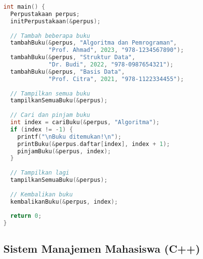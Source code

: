 \documentclass[../main.tex]{subfiles}
\begin{document}
\begin{lstlisting}[language=C, caption={Sistem perpustakaan sederhana di C}]
int main() {
  Perpustakaan perpus;
  initPerpustakaan(&perpus);
  
  // Tambah beberapa buku
  tambahBuku(&perpus, "Algoritma dan Pemrograman", 
             "Prof. Ahmad", 2023, "978-1234567890");
  tambahBuku(&perpus, "Struktur Data", 
             "Dr. Budi", 2022, "978-0987654321");
  tambahBuku(&perpus, "Basis Data", 
             "Prof. Citra", 2021, "978-1122334455");
  
  // Tampilkan semua buku
  tampilkanSemuaBuku(&perpus);
  
  // Cari dan pinjam buku
  int index = cariBuku(&perpus, "Algoritma");
  if (index != -1) {
    printf("\nBuku ditemukan!\n");
    printBuku(&perpus.daftar[index], index + 1);
    pinjamBuku(&perpus, index);
  }
  
  // Tampilkan lagi
  tampilkanSemuaBuku(&perpus);
  
  // Kembalikan buku
  kembalikanBuku(&perpus, index);
  
  return 0;
}
\end{lstlisting}

\subsection{Sistem Manajemen Mahasiswa (C++)}
\end{document}
